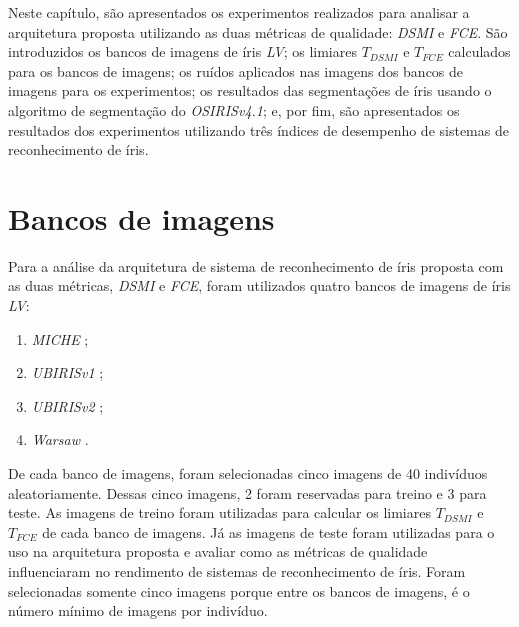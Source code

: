 
\par Neste capítulo, são apresentados os experimentos realizados para analisar a arquitetura proposta utilizando as duas métricas de qualidade: \textit{\acrshort{DSMI}} e \textit{\acrshort{FCE}}. São introduzidos os bancos de imagens de íris \textit{\acrshort{LV}}; os limiares $T_{DSMI}$ e $T_{FCE}$ calculados para os bancos de imagens; os ruídos aplicados nas imagens dos bancos de imagens para os experimentos; os resultados das segmentações de íris usando o algoritmo de segmentação do \textit{OSIRISv4.1}; e, por fim, são apresentados os resultados dos experimentos utilizando três índices de desempenho de sistemas de reconhecimento de íris.


\section{Bancos de imagens} \label{sec:experimentos:db}

\par Para a análise da arquitetura de sistema de reconhecimento de íris proposta com as duas métricas, \textit{\acrshort{DSMI}} e \textit{\acrshort{FCE}}, foram utilizados quatro bancos de imagens de íris \textit{\acrshort{LV}}: 

\begin{enumerate}
    \item \textit{MICHE} \cite{marsico2017-MICHE-1, santada2016-MICHE-2, miche};
    \item \textit{UBIRISv1} \cite{proenca2005-ubirisv1, ubirisv1};
    \item \textit{UBIRISv2} \cite{proence2010-ubirisv2, ubirisv2};
    \item \textit{\acrfull{Warsaw}} \cite{trokielwicz2016-Warsaw, warsaw}.
\end{enumerate}

\par De cada banco de imagens, foram selecionadas cinco imagens de 40 indivíduos aleatoriamente. Dessas cinco imagens, 2 foram reservadas para treino e 3 para teste. As imagens de treino foram utilizadas para calcular os limiares $T_{DSMI}$ e $T_{FCE}$ de cada banco de imagens. Já as imagens de teste foram utilizadas para o uso na arquitetura proposta e avaliar como as métricas de qualidade influenciaram no rendimento de sistemas de reconhecimento de íris. Foram selecionadas somente cinco imagens porque entre os bancos de imagens, é o número mínimo de imagens por indivíduo.


